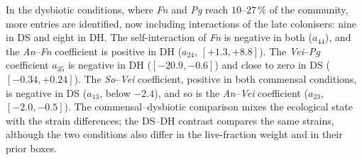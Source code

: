 In the dysbiotic conditions, where \textit{Fn} and \textit{Pg} reach
$10$--$27\,\%$ of the community, more entries are identified, now including
interactions of the late colonisers: nine in DS and eight in DH. The
self-interaction of \textit{Fn} is negative in both ($a_{44}$), and the
\textit{An}--\textit{Fn} coefficient is positive in DH ($a_{24}$,
$[+1.3,+8.8]$). The \textit{Vei}--\textit{Pg} coefficient $a_{35}$ is negative
in DH ($[-20.9,-0.6]$) and close to zero in DS ($[-0.34,+0.24]$). The
\textit{So}--\textit{Vei} coefficient, positive in both commensal conditions, is
negative in DS ($a_{13}$, below $-2.4$), and so is the \textit{An}--\textit{Vei}
coefficient ($a_{23}$, $[-2.0,-0.5]$). The commensal--dysbiotic comparison mixes the
ecological state with the strain differences; the DS--DH
contrast compares the same strains, although the two conditions also differ in
the live-fraction weight and in their prior boxes.

